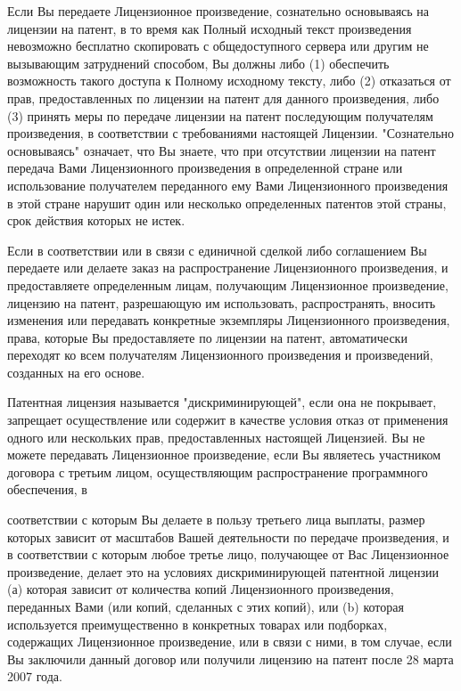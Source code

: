 Если Вы передаете Лицензионное произведение, сознательно основываясь на лицензии на патент, в то время как Полный исходный текст произведения невозможно бесплатно скопировать с общедоступного сервера или другим не вызывающим затруднений способом, Вы должны либо (1) обеспечить возможность такого доступа к Полному исходному тексту, либо (2) отказаться от прав, предоставленных по лицензии на патент для данного произведения, либо (3) принять меры по передаче лицензии на патент последующим получателям произведения, в соответствии с требованиями настоящей Лицензии. "{}Сознательно основываясь"{} означает, что Вы знаете, что при отсутствии лицензии на патент передача Вами Лицензионного произведения в определенной стране или использование получателем переданного ему Вами Лицензионного произведения в этой стране нарушит один или несколько определенных патентов этой страны, срок действия которых не истек.

Если в соответствии или в связи с единичной сделкой либо соглашением Вы передаете или делаете заказ на распространение Лицензионного произведения, и предоставляете определенным лицам, получающим Лицензионное произведение, лицензию на патент, разрешающую им использовать, распространять, вносить изменения или передавать конкретные экземпляры Лицензионного произведения, права, которые Вы предоставляете по лицензии на патент, автоматически переходят ко всем получателям Лицензионного произведения и произведений, созданных на его основе.

Патентная лицензия называется "{}дискриминирующей"{}, если она не покрывает, запрещает осуществление или содержит в качестве условия отказ от применения одного или нескольких прав, предоставленных настоящей Лицензией. Вы не можете передавать Лицензионное произведение, если Вы являетесь участником договора с третьим лицом, осуществляющим распространение программного обеспечения, в

соответствии с которым Вы делаете в пользу третьего лица выплаты, размер которых зависит от масштабов Вашей деятельности по передаче произведения, и в соответствии с которым любое третье лицо, получающее от Вас Лицензионное произведение, делает это на условиях дискриминирующей патентной лицензии (а) которая зависит от количества копий Лицензионного произведения, переданных Вами (или копий, сделанных с этих копий), или (b) которая используется преимущественно в конкретных товарах или подборках, содержащих Лицензионное произведение, или в связи с ними, в том случае, если Вы заключили данный договор или получили лицензию на патент после 28 марта 2007 года.

